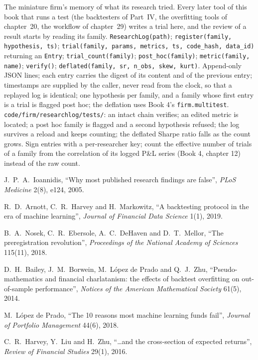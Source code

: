 \begin{build}
 The miniature firm's memory of what its research tried. Every later tool of this book that runs a test
(the backtesters of Part~IV, the overfitting tools of chapter~20, the workflow of chapter~29) writes a trial here, and the
review of a result starts by reading its family.
 \texttt{ResearchLog(path)}; \texttt{register(family, hypothesis, ts)};
\texttt{trial(family, params, metrics, ts, code\_hash, data\_id)} returning an \texttt{Entry}; \texttt{trial\_count(family)};
\texttt{post\_hoc(family)}; \texttt{metric(family, name)}; \texttt{verify()}; \texttt{deflated(family, sr, n\_obs, skew, kurt)}.
 Append-only JSON lines; each entry carries the digest of its content and of the previous entry; timestamps are
supplied by the caller, never read from the clock, so that a replayed log is identical; one hypothesis per family, and a family
whose first entry is a trial is flagged post hoc; the deflation uses Book 4's \texttt{firm.multitest}.
 \texttt{code/firm/researchlog/tests/}: an intact chain verifies; an edited metric is located; a post
hoc family is flagged and a second hypothesis refused; the log survives a reload and keeps counting; the deflated Sharpe ratio
falls as the count grows.
 Sign entries with a per-researcher key; count the effective number of trials of a family from the
correlation of its logged P\&L series (Book 4, chapter 12) instead of the raw count.
\end{build}

\begin{omsources}
\item J.~P.~A.~Ioannidis, ``Why most published research findings are false'', \emph{PLoS Medicine} 2(8), e124, 2005.
\item R.~D.~Arnott, C.~R.~Harvey and H.~Markowitz, ``A backtesting protocol in the era of machine learning'', \emph{Journal of
Financial Data Science} 1(1), 2019.
\item B.~A.~Nosek, C.~R.~Ebersole, A.~C.~DeHaven and D.~T.~Mellor, ``The preregistration revolution'', \emph{Proceedings of the
National Academy of Sciences} 115(11), 2018.
\item D.~H.~Bailey, J.~M.~Borwein, M.~López de Prado and Q.~J.~Zhu, ``Pseudo-mathematics and financial charlatanism: the effects
of backtest overfitting on out-of-sample performance'', \emph{Notices of the American Mathematical Society} 61(5), 2014.
\item M.~López de Prado, ``The 10 reasons most machine learning funds fail'', \emph{Journal of Portfolio Management} 44(6), 2018.
\item C.~R.~Harvey, Y.~Liu and H.~Zhu, ``\dots and the cross-section of expected returns'', \emph{Review of Financial Studies}
29(1), 2016.
\end{omsources}


